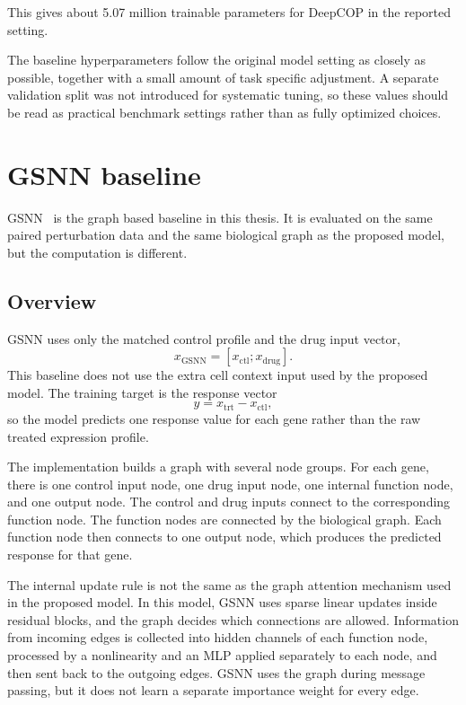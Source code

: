 \noindent This gives about 5.07 million trainable parameters for DeepCOP in the reported setting.

\noindent The baseline hyperparameters follow the original model setting as closely as possible, together with a small amount of task specific adjustment. A separate validation split was not introduced for systematic tuning, so these values should be read as practical benchmark settings rather than as fully optimized choices.
\section{GSNN baseline}
GSNN~\cite{evans2024gsnn} is the graph based baseline in this thesis. It is evaluated on the same paired perturbation data and the same biological graph as the proposed model, but the computation is different.

\subsection{Overview}
\noindent GSNN uses only the matched control profile and the drug input vector,
\begin{equation}
x_{\mathrm{GSNN}} = [x_{\mathrm{ctl}}; x_{\mathrm{drug}}].
\end{equation}
This baseline does not use the extra cell context input used by the proposed model. The training target is the response vector
\begin{equation}
y = x_{\mathrm{trt}} - x_{\mathrm{ctl}},
\end{equation}
so the model predicts one response value for each gene rather than the raw treated expression profile.

\noindent The implementation builds a graph with several node groups. For each gene, there is one control input node, one drug input node, one internal function node, and one output node. The control and drug inputs connect to the corresponding function node. The function nodes are connected by the biological graph. Each function node then connects to one output node, which produces the predicted response for that gene.

\noindent The internal update rule is not the same as the graph attention mechanism used in the proposed model. In this model, GSNN uses sparse linear updates inside residual blocks, and the graph decides which connections are allowed. Information from incoming edges is collected into hidden channels of each function node, processed by a nonlinearity and an MLP applied separately to each node, and then sent back to the outgoing edges. GSNN uses the graph during message passing, but it does not learn a separate importance weight for every edge.

